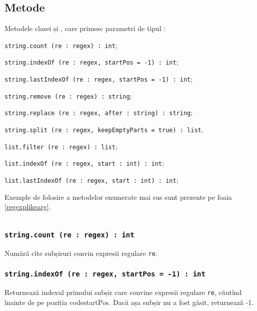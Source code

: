 \subsection{Metode}

Metodele clasei \str{} și \listtype, care primesc parametri de tipul \regex{}:
\begin{icItems}
\item
\texttt{string.count (re : regex) : int};
\item
\texttt{string.indexOf (re : regex, startPos = -1) : int};
\item
\texttt{string.lastIndexOf (re : regex, startPos = -1) : int};
\item
\texttt{string.remove (re : regex) : string};
\item 
\texttt{string.replace (re : regex, after : string) : string};
\item
\texttt{string.split (re : regex, keepEmptyParts = true) : list}.
\item
\texttt{list.filter (re : regex) : list};
\item
\texttt{list.indexOf (re : regex, start : int) : int};
\item
\texttt{list.lastIndexOf (re : regex, start : int) : int};
\end{icItems}

Exemple de folosire a metodelor enumerate mai sus sunt prezente pe foaia \ref{regexplikearg}.

\begin{sourcecode}
    \label{regexplikearg}
    \inputminted[linenos]{icl}{../sources/regexplikearg.icL}
\end{sourcecode}

\subsubsection{\texttt{string.count (re : regex) : int}}

Numără cîte subșiruri convin expresii regulare \texttt{re}.

\subsubsection{\texttt{string.indexOf (re : regex, startPos = -1) : int}}

Returnează indexul primului subșir care convine expresii regulare \texttt{re}, căutînd înainte de pe poziția code{startPos}. Dacă așa subșir nu a fost găsit, returnează -1.

